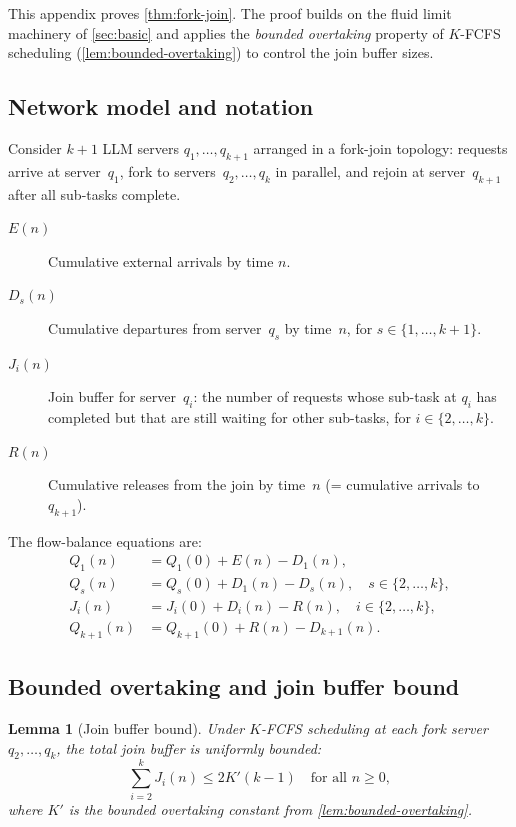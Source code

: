 \documentclass[11pt]{article}
\theoremstyle{plain}
\newtheorem{lemma}[theorem]{Lemma}
\theoremstyle{definition}
\theoremstyle{remark}
\begin{document}
This appendix proves \cref{thm:fork-join}. The proof builds on the fluid limit machinery of \cref{sec:basic} and applies the \emph{bounded overtaking} property of $K$-FCFS scheduling (\cref{lem:bounded-overtaking}) to control the join buffer sizes.

\subsection{Network model and notation}

Consider $k+1$ LLM servers $q_1,\ldots,q_{k+1}$ arranged in a fork-join topology: requests arrive at server~$q_1$, fork to servers~$q_2,\ldots,q_k$ in parallel, and rejoin at server~$q_{k+1}$ after all sub-tasks complete.

\begin{description}
  \item[$E(n)$] Cumulative external arrivals by time $n$.
  \item[$D_s(n)$] Cumulative departures from server~$q_s$ by time~$n$, for $s \in \{1,\ldots,k+1\}$.
  \item[$J_i(n)$] Join buffer for server~$q_i$: the number of requests whose sub-task at $q_i$ has completed but that are still waiting for other sub-tasks, for $i\in\{2,\ldots,k\}$.
  \item[$R(n)$] Cumulative releases from the join by time~$n$ (= cumulative arrivals to $q_{k+1}$).
\end{description}

The flow-balance equations are:
\begin{align}
Q_1(n) &= Q_1(0) + E(n) - D_1(n), \label{eq:fj-q1-gen}\\
Q_s(n) &= Q_s(0) + D_1(n) - D_s(n), \quad s \in \{2,\ldots,k\}, \label{eq:fj-qs-gen}\\
J_i(n) &= J_i(0) + D_i(n) - R(n), \quad i \in \{2,\ldots,k\}, \label{eq:fj-ji-gen}\\
Q_{k+1}(n) &= Q_{k+1}(0) + R(n) - D_{k+1}(n). \label{eq:fj-qk1-gen}
\end{align}

\subsection{Bounded overtaking and join buffer bound}

\begin{lemma}[Join buffer bound]\label{lem:join-bound-gen}
Under $K$-FCFS scheduling at each fork server $q_2,\ldots,q_k$, the total join buffer is uniformly bounded:
\[
\sum_{i=2}^{k} J_i(n) \le 2K'(k-1) \quad \text{for all } n\ge 0,
\]
where $K'$ is the bounded overtaking constant from \cref{lem:bounded-overtaking}.
\end{lemma}
\end{document}
